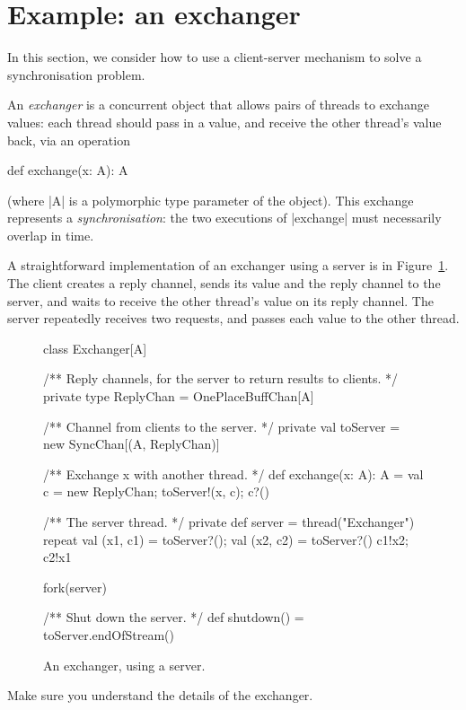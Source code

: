\section{Example: an exchanger}

In this section, we consider how to use a client-server mechanism to solve a
synchronisation problem.  

An \emph{exchanger} is a concurrent object that
allows pairs of threads to exchange values: each thread should pass in a
value, and receive the other thread's value back, via an operation
\begin{scala}
  def exchange(x: A): A 
\end{scala}
(where |A| is a polymorphic type parameter of the object).  This exchange
represents a \emph{synchronisation}: the two executions of |exchange| must
necessarily overlap in time.

A straightforward implementation of an exchanger using a server is in
Figure~\ref{fig:exchanger}.  The client creates a reply channel, sends its
value and the reply channel to the server, and waits to receive the other
thread's value on its reply channel.  The server repeatedly receives two
requests, and passes each value to the other thread.


\begin{figure}
\begin{scala}
class Exchanger[A]{
  /** Reply channels, for the server to return results to clients. */
  private type ReplyChan = OnePlaceBuffChan[A]

  /** Channel from clients to the server. */
  private val toServer = new SyncChan[(A, ReplyChan)]

  /** Exchange x with another thread. */
  def exchange(x: A): A = {
    val c = new ReplyChan; toServer!(x, c); c?()
  }

  /** The server thread. */
  private def server = thread("Exchanger"){
    repeat{
      val (x1, c1) = toServer?(); val (x2, c2) = toServer?()
      c1!x2; c2!x1
    }
  }

  fork(server)

  /** Shut down the server. */
  def shutdown() = toServer.endOfStream()
}
\end{scala}
\caption{An exchanger, using a server.}
\label{fig:exchanger}
\end{figure}


\begin{instruction}
Make sure you understand the details of the exchanger.
\end{instruction}

